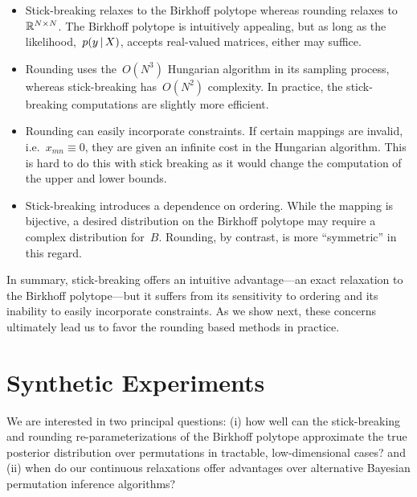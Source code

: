 \documentclass[twoside]{article}
\begin{document}
\begin{itemize}
\item Stick-breaking relaxes to the Birkhoff polytope whereas rounding
  relaxes to~$\mathbb{R}^{N \times N}$. The Birkhoff polytope is
  intuitively appealing, but as long as the
  likelihood,~$p(y \, | \, X)$, accepts real-valued matrices, either
  may suffice.
  
\item Rounding uses the~$O(N^3)$ Hungarian algorithm in its sampling
  process, whereas stick-breaking has~$O(N^2)$ complexity. In practice,
  the stick-breaking computations are slightly more efficient.
    
\item Rounding can easily incorporate constraints.  If certain
  mappings are invalid, i.e.~${x_{mn} \equiv 0}$, they are given an
  infinite cost in the Hungarian algorithm. This is hard to do this
  with stick breaking as it would change the computation of the upper
  and lower bounds. %
  
\item Stick-breaking introduces a dependence on ordering.  While the
  mapping is bijective, a desired distribution on the Birkhoff polytope
  may require a complex distribution for~$B$.  Rounding, by contrast,
  is more ``symmetric'' in this regard.
  
\end{itemize}

In summary, stick-breaking offers an intuitive advantage---an exact
relaxation to the Birkhoff polytope---but it suffers from its
sensitivity to ordering and its inability to easily incorporate
constraints.  As we show next, these concerns ultimately lead us to
favor the rounding based methods in practice.

\section{Synthetic Experiments}
\label{sec:synthetic}
We are interested in two principal questions: 
 (i) how well can the stick-breaking and rounding re-parameterizations
of the Birkhoff polytope approximate the true posterior distribution
over permutations in tractable, low-dimensional cases? and (ii)
when do our continuous relaxations offer
advantages over alternative  Bayesian permutation
inference algorithms?

\end{document}
